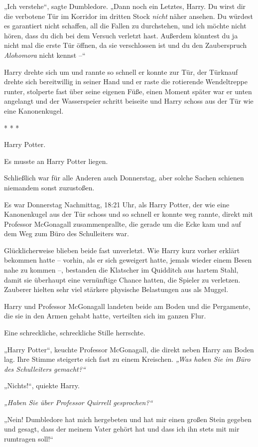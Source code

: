 {„Ich verstehe“, sagte Dumbledore. „Dann noch ein Letztes, Harry. Du wirst dir die verbotene Tür im Korridor im dritten Stock \emph{nicht} näher ansehen. Du würdest es garantiert nicht schaffen, all die Fallen zu durchstehen, und ich möchte nicht hören, dass du dich bei dem Versuch verletzt hast. Außerdem könntest du ja nicht mal die erste Tür öffnen, da sie verschlossen ist und du den Zauberspruch \emph{Alohomora} nicht kennst --“

Harry drehte sich um und rannte so schnell er konnte zur Tür, der Türknauf drehte sich bereitwillig in seiner Hand und er raste die rotierende Wendeltreppe runter, stolperte fast über seine eigenen Füße, einen Moment später war er unten angelangt und der Wasserspeier schritt beiseite und Harry schoss aus der Tür wie eine Kanonenkugel.

* * *

Harry Potter.

Es musste an Harry Potter liegen.

Schließlich war für alle Anderen auch Donnerstag, aber solche Sachen schienen niemandem sonst zuzustoßen.

Es war Donnerstag Nachmittag, 18:21 Uhr, als Harry Potter, der wie eine Kanonenkugel aus der Tür schoss und so schnell er konnte weg rannte, direkt mit Professor McGonagall zusammenprallte, die gerade um die Ecke kam und auf dem Weg zum Büro des Schulleiters war.

Glücklicherweise blieben beide fast unverletzt. Wie Harry kurz vorher erklärt bekommen hatte -- vorhin, als er sich geweigert hatte, jemals wieder einem Besen nahe zu kommen --, bestanden die Klatscher im Quidditch aus hartem Stahl, damit sie überhaupt eine vernünftige Chance hatten, die Spieler zu verletzen. Zauberer hielten sehr viel stärkere physische Belastungen aus als Muggel.

Harry und Professor McGonagall landeten beide am Boden und die Pergamente, die sie in den Armen gehabt hatte, verteilten sich im ganzen Flur.

Eine schreckliche, schreckliche Stille herrschte.

„Harry Potter“, keuchte Professor McGonagall, die direkt neben Harry am Boden lag. Ihre Stimme steigerte sich fast zu einem Kreischen. \emph{„Was haben Sie im Büro des Schulleiters gemacht?“}

„Nichts!“, quiekte Harry.

\emph{„Haben Sie über Professor Quirrell gesprochen?“}

„Nein! Dumbledore hat mich hergebeten und hat mir einen großen Stein gegeben und gesagt, dass der meinem Vater gehört hat und dass ich ihn stets mit mir rumtragen soll!“

}
